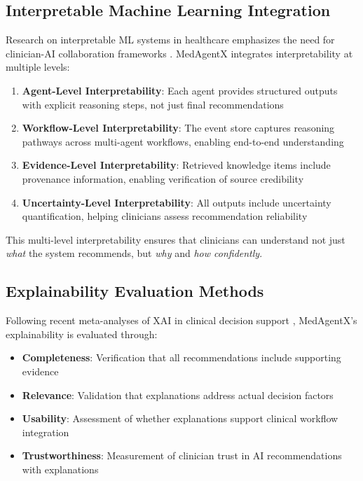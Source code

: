 \documentclass[conference]{IEEEtran}
\begin{document}
\subsection{Interpretable Machine Learning Integration}
Research on interpretable ML systems in healthcare emphasizes the need for clinician-AI collaboration frameworks \cite{interpretable_ml_healthcare_2023}. MedAgentX integrates interpretability at multiple levels:

\begin{enumerate}
    \item \textbf{Agent-Level Interpretability}: Each agent provides structured outputs with explicit reasoning steps, not just final recommendations
    \item \textbf{Workflow-Level Interpretability}: The event store captures reasoning pathways across multi-agent workflows, enabling end-to-end understanding
    \item \textbf{Evidence-Level Interpretability}: Retrieved knowledge items include provenance information, enabling verification of source credibility
    \item \textbf{Uncertainty-Level Interpretability}: All outputs include uncertainty quantification, helping clinicians assess recommendation reliability
\end{enumerate}

This multi-level interpretability ensures that clinicians can understand not just \textit{what} the system recommends, but \textit{why} and \textit{how confidently}.

\subsection{Explainability Evaluation Methods}
Following recent meta-analyses of XAI in clinical decision support \cite{xai_meta_2024}, MedAgentX's explainability is evaluated through:

\begin{itemize}
    \item \textbf{Completeness}: Verification that all recommendations include supporting evidence
    \item \textbf{Relevance}: Validation that explanations address actual decision factors
    \item \textbf{Usability}: Assessment of whether explanations support clinical workflow integration
    \item \textbf{Trustworthiness}: Measurement of clinician trust in AI recommendations with explanations
\end{itemize}
\end{document}
